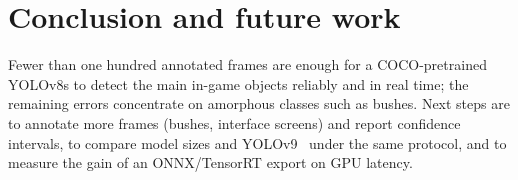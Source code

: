 \documentclass[10pt,twocolumn]{article}
\begin{document}
\section{Conclusion and future work}
Fewer than one hundred annotated frames are enough for a COCO-pretrained YOLOv8s to detect the main in-game
objects reliably and in real time; the remaining errors concentrate on amorphous classes such as bushes.
Next steps are to annotate more frames (bushes, interface screens) and report confidence intervals, to compare
model sizes and YOLOv9~\cite{wang2024yolov9} under the same protocol, and to measure the gain of an
ONNX/TensorRT export on GPU latency.



\end{document}
